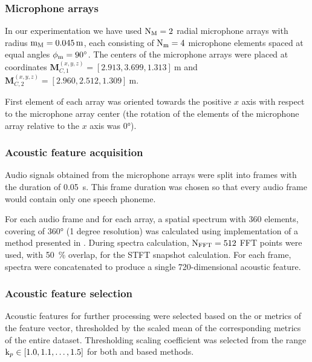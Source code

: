 \documentclass[applsci,article,submit,moreauthors,pdftex]{Definitions/mdpi}
\begin{document}
\subsubsection{Microphone arrays}
In our experimentation we have used $ \mathrm{N}_{\mathrm{M}} = 2 $ radial microphone arrays with radius $ \radius_{\arr} = \SI{0.045}{\m} $, each consisting of $ \mathrm{N}_{\mathrm{m}} = 4 $ microphone elements spaced at equal angles $ \phi_{\mathrm{m}} = \ang{90} $. The centers of the microphone arrays were placed at coordinates $ \mathbf{M}_{C,1}^{(x,y,z)} = [2.913, 3.699, 1.313]~\si{\m} $ and $ \mathbf{M}_{C,2}^{(x,y,z)} = [2.960, 2.512, 1.309]~\si{\m} $.

First element of each array was oriented towards the positive $ x $ axis with respect to the microphone array center (the rotation of the elements of the microphone array relative to the $ x $ axis was \ang{0}). 

\subsubsection{Acoustic feature acquisition}

Audio signals obtained from the microphone arrays were split into frames with the duration of \SI{0.05}{\s}. This frame duration was chosen so that every audio frame would contain only one speech phoneme.

For each audio frame and for each array, a \srpphat{} spatial spectrum with 360 elements, covering \doa{} of \ang{360} (1 degree resolution) was calculated using \pra{} \python{} implementation \cite{scheiblerPyroomacousticsPythonPackage2018a} of a method presented in \cite{dibiaseHighaccuracyLowlatencyTechnique2000}. During \srpphat{} spectra calculation, $ \mathrm{N}_{\mathrm{FFT}}{} = 512 $ FFT points were used, with \SI{50}{\percent} overlap, for the STFT snapshot calculation. For each frame, \srpphat{} spectra were concatenated to produce a single 720-dimensional acoustic feature.

\subsubsection{Acoustic feature selection}
Acoustic features for further processing were selected based on the \rms{} or \cf{} metrics of the feature vector, thresholded by the scaled mean of the corresponding metrics of the entire dataset.
Thresholding scaling coefficient \thrmeanlvl{} was selected from the range $ \mathrm{k}_{p} \in [1.0, 1.1, \dots, 1.5] $ for both \rms{} and \cf{} based methods.
\end{document}
